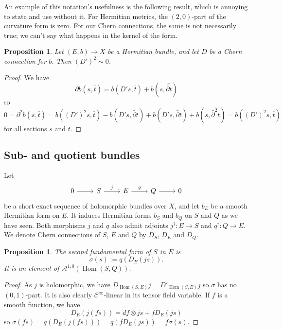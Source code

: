 \documentclass[10pt,a4paper]{amsart}
\newtheorem{prop}[theo]{Proposition}
\theoremstyle{definition}
\newcommand{\cc}[1]{\mathcal{#1}}
\def\ov#1{\overline{#1}}
\DeclareMathOperator{\Hom}{Hom}
\def\snd{\sigma}
\begin{document}
An example of this notation's usefulness is the following result, which is annoying to state and use without it. For Hermitian metrics, the $(2,0)$-part of the curvature form is zero. For our Chern connections, the same is not necessarily true; we can't say what happens in the kernel of the form.

\begin{prop}
Let $(E, b) \to X$ be a Hermitian bundle, and let $D$ be a Chern connection for $b$. Then $(D')^2 \sim 0$.
\end{prop}

\begin{proof}
We have
\[
\partial b(s, \ov t)
= b(D's, \ov t) + b(s, \ov{\bar\partial t})
\]
so
\[
0 = \partial^2 b(s, \ov t)
= b((D')^2s, \ov t)
- b(D's, \ov{\bar\partial t})
+ b(D's, \ov{\bar\partial t})
+ b(s, \ov{\bar\partial^2 t})
= b((D')^2s, \ov t)
\]
for all sections $s$ and $t$.
\end{proof}




\subsection*{Sub- and quotient bundles}

Let
\[
\begin{tikzcd}
0 \ar[r] &
S \ar[r,"j"] &
E \ar[r,"q"] &
Q \ar[r] &
0
\end{tikzcd}
\]
be a short exact sequence of holomorphic bundles over $X$, and let $b_E$ be a smooth Hermitian form on $E$. It induces Hermitian forms $b_S$ and $b_Q$ on $S$ and $Q$ as we have seen. Both morphisms $j$ and $q$ also admit adjoints $j^\dagger: E \to S$ and $q^\dagger : Q \to E$. We denote Chern connections of $S$, $E$ and $Q$ by $D_S$, $D_E$ and $D_Q$.




\begin{prop}
The \emph{second fundamental form} of $S$ in $E$ is
\[
\snd(s) := q(D_E(js)).
\]
It is an element of $\cc A^{1,0}(\Hom(S,Q))$.
\end{prop}

\begin{proof}
As $j$ is holomorphic, we have $D_{\Hom(S,E)}j = D'_{\Hom(S,E)}j$ so $\snd$ has no $(0,1)$-part. It is also clearly $\cc C^\infty$-linear in its tensor field variable. If $f$ is a smooth function, we have
\[
D_E(j(fs))
= df \otimes js + f D_E(js)
\]
so $\snd(fs) = q(D_E(j(fs))) = q(f D_E(js)) = f\snd(s)$.
\end{proof}
\end{document}
